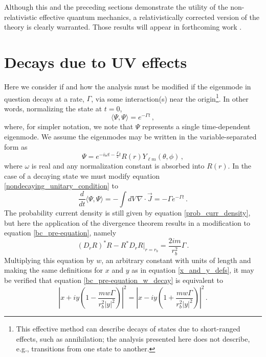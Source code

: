 \documentclass[pra,twocolumn,nofootinbib, superscriptaddress]{revtex4}%
\def\sec#1{\section{#1} }
\def\({\left(}
\def\){\right)}
\def\f#1#2{\frac{#1}{#2}}
\def\del{\nabla}
\def\o{\omega}
\def\th{\theta}
\def\ph{\phi}
\def\<{\langle}
\def\>{\rangle}
\providecommand{\abs}[1]{\left\lvert#1\right\rvert}
\begin{document}
Although this and the preceding sections demonstrate the utility of the non-relativistic effective quantum mechanics, a relativistically corrected version of the theory is clearly warranted. Those results will appear in forthcoming work  \cite{JacobsPs}. 




\sec{Decays due to UV effects}\label{Sec:Decay}



Here we consider if and how the analysis must be modified if the eigenmode in question decays at a rate, $\Gamma$, via some interaction(s) near the origin\footnote{This effective method can describe decays of states due to short-ranged effects, such as annihilation; the analysis presented here does not describe, e.g., transitions from one state to another.}. In other words, normalizing the state at $t=0$,
\begin{equation}
\<\Psi,\Psi\>=e^{-\Gamma t}\,,
\end{equation}
where, for simpler notation, we note that $\Psi$ represents a single time-dependent eigenmode. We assume the eigenmodes may be written in the variable-separated form as
\begin{equation}\label{decaying_eigenmode}
\Psi=e^{-i\o t - \f{\Gamma}{2}t  }  R\(r\) Y_{\ell m}\(\th,\ph\)\,,
\end{equation}
where $\o$ is real and any normalization constant is absorbed into $R(r)$. In the case of a decaying state we must modify equation \eqref{nondecaying_unitary_condition} to 
\begin{equation}\label{decaying_unitary_condition}
\f{d}{dt} \<\Psi,\Psi\> =-\int dV\,\del\cdot \vec{J} =-\Gamma e^{-\Gamma t} \,.
\end{equation}
The probability current density is still given by equation \eqref{prob_curr_density}, but here the application of the divergence theorem results in a modification to equation \eqref{bc_pre-equation}, namely
\begin{equation}\label{bc_pre-equation_w_decay}
\(D_r R\)^*R-R^* D_r R\bigg|_{r=r_b}=\f{2im}{r_b^2}\Gamma\,.
\end{equation}
Multiplying this equation by $w$, an arbitrary constant with units of length and making the same definitions for $x$ and $y$ as in equation \eqref{x_and_y_defs}, it may be verified that equation \eqref{bc_pre-equation_w_decay} is equivalent to
\begin{equation}
\abs{x+iy\(1-\f{mw\Gamma}{r_b^2\abs{y}^2}\)}^2=\abs{x-iy\(1+\f{mw\Gamma}{r_b^2\abs{y}^2}\)}^2\,.
\end{equation}
\end{document}
